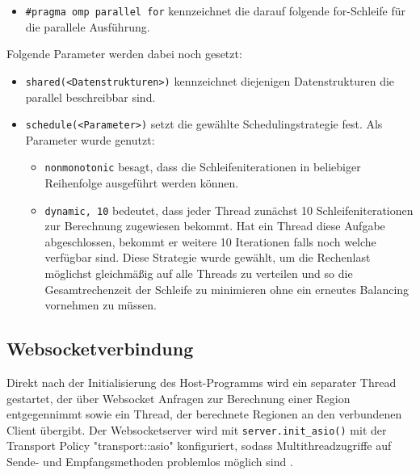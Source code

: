\begin{itemize}
	\item \verb|#pragma omp parallel for| kennzeichnet die darauf folgende for-Schleife für die parallele Ausführung.
\end{itemize}

Folgende Parameter werden dabei noch gesetzt:

\begin{itemize}
	\item \verb|shared(<Datenstrukturen>)| kennzeichnet diejenigen Datenstrukturen die parallel beschreibbar sind.

	\item \verb|schedule(<Parameter>)| setzt die gewählte Schedulingstrategie fest. Als Parameter wurde genutzt:

	      \begin{itemize}
		      \item \verb|nonmonotonic| besagt, dass die Schleifeniterationen in beliebiger Reihenfolge ausgeführt werden können.

		      \item \verb|dynamic, 10| bedeutet, dass jeder Thread zunächst 10 Schleifeniterationen zur Berechnung zugewiesen bekommt. Hat ein Thread diese Aufgabe abgeschlossen, bekommt er weitere 10 Iterationen falls noch welche verfügbar sind. Diese Strategie wurde gewählt, um die Rechenlast möglichst gleichmäßig auf alle Threads zu verteilen und so die Gesamtrechenzeit der Schleife zu minimieren ohne ein erneutes Balancing vornehmen zu müssen.
	      \end{itemize}
\end{itemize}


\subsection{Websocketverbindung}\label{cls:Host}

Direkt nach der Initialisierung des Host-Programms wird ein separater Thread gestartet, der über Websocket
Anfragen zur Berechnung einer Region entgegennimmt sowie ein Thread, der berechnete Regionen an den verbundenen Client übergibt.
Der Websocketserver wird mit \verb|server.init_asio()| mit der Transport Policy "transport::asio"
konfiguriert, sodass Multithreadzugriffe auf Sende- und Empfangsmethoden problemlos möglich sind \cite{websocketppManual}.

